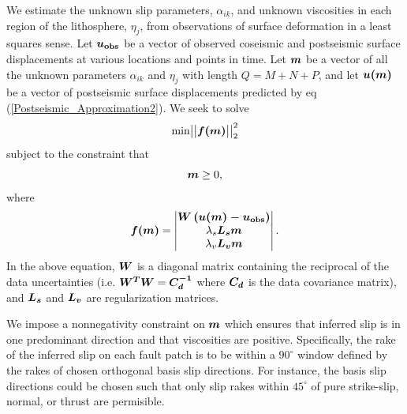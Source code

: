 \documentclass[extra,mreferee]{gji}
\begin{document}
We estimate the unknown slip parameters, $\alpha_{ik}$, and unknown
viscosities in each region of the lithosphere, $\eta_j$, from
observations of surface deformation in a least squares sense. Let
$\mitbf{u_{\mathrm{obs}}}$ be a vector of observed coseismic and postseismic
surface displacements at various locations and points in time.  Let
$\mitbf{m}$ be a vector of all the unknown parameters $\alpha_{ik}$
and $\eta_j$ with length $Q=M+N+P$, and let $\mitbf{u(m)}$ be a vector
of postseismic surface displacements predicted by eq
(\ref{Postseismic_Approximation2}). We seek to solve
\begin{equation}\label{Inverse_Problem}
  \mathrm{min}
  \big|\big|\mitbf{f(m)}\big|\big|_2^2
\end{equation}
subject to the constraint that
\begin{equation}
  \mitbf{m}\geq0,
\end{equation}
where 
\begin{equation}\label{ResidualFunction}
  \mitbf{f(m)} = 
    \begin{vmatrix}
      \mitbf{W\left(u(m)-u_{\mathrm{obs}}\right)}\\
      \lambda_s\mitbf{L_sm}\\
      \lambda_v\mitbf{L_vm}\\
    \end{vmatrix} .
\end{equation}  
In the above equation, $\mitbf{W}$ is a diagonal matrix containing the
reciprocal of the data uncertainties
(i.e. $\mitbf{W^TW}=\mitbf{C_d^{-1}}$ where $\mitbf{C_d}$ is
the data covariance matrix), and $\mitbf{L_s}$ and $\mitbf{L_v}$ are
regularization matrices.

We impose a nonnegativity constraint on $\mitbf{m}$ which ensures that
inferred slip is in one predominant direction and that viscosities are
positive.  Specifically, the rake of the inferred slip on each fault
patch is to be within a $90^\circ$ window defined by the rakes of
chosen orthogonal basis slip directions. For instance, the basis slip
directions could be chosen such that only slip rakes within $45^\circ$
of pure strike-slip, normal, or thrust are permisible.
\end{document}
